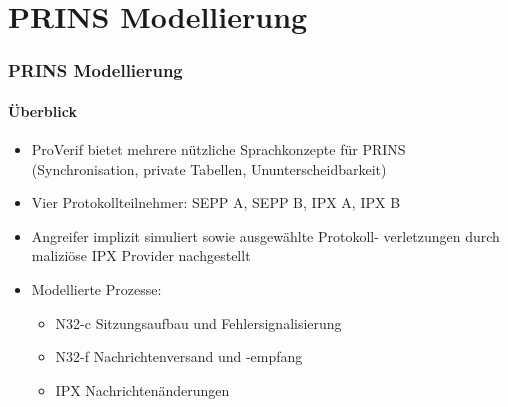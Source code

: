 \documentclass{beamer}
\begin{document}
\section{PRINS Modellierung}

\begin{frame}
    \frametitle{PRINS Modellierung}
    \framesubtitle{Überblick}

    \begin{itemize}
        \item<1-> ProVerif bietet mehrere nützliche Sprachkonzepte für PRINS (Synchronisation, private Tabellen, Ununterscheidbarkeit)
        \vspace*{2mm}
        \item<2-> Vier Protokollteilnehmer: SEPP A, SEPP B, IPX A, IPX B
        \vspace*{2mm}
        \item<3-> Angreifer implizit simuliert sowie ausgewählte Protokoll- verletzungen durch maliziöse IPX Provider nachgestellt
        \vspace*{2mm}
        \item<4-> Modellierte Prozesse:
        \begin{itemize}
            \item<4-> N32-c Sitzungsaufbau und Fehlersignalisierung
            \item<4-> N32-f Nachrichtenversand und -empfang
            \item<4-> IPX Nachrichtenänderungen
        \end{itemize}
    \end{itemize}
\end{frame}
\end{document}
